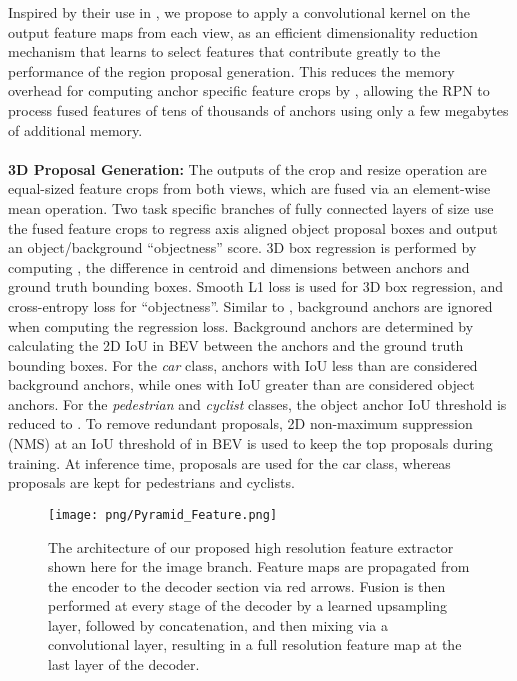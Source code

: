 \documentclass[letterpaper, 10 pt, conference]{ieeeconf}
\begin{document}
Inspired by their use in \cite{iandola2016squeezenet}, we propose to apply a  convolutional kernel on the output feature maps from each view, as an efficient dimensionality reduction mechanism that learns to select features that contribute greatly to the performance of the region proposal generation. This reduces the memory overhead for computing anchor specific feature crops by , allowing the RPN to process fused features of tens of thousands of anchors using only a few megabytes of additional memory.
\\
\\
\textbf{3D Proposal Generation:} The outputs of the crop and resize operation are equal-sized feature crops from both views, which are fused via an element-wise mean operation. Two task specific branches \cite{ren2015faster} of fully connected layers of size  use the fused feature crops to regress axis aligned object proposal boxes and output an object/background ``objectness'' score. 3D box regression is performed by computing , the difference in centroid and dimensions between anchors and ground truth bounding boxes. Smooth L1 loss is used for 3D box regression, and cross-entropy loss for ``objectness''. Similar to \cite{ren2015faster}, background anchors are ignored when computing the regression loss. Background anchors are determined by calculating the 2D IoU in BEV between the anchors and the ground truth bounding boxes. For the \textit{car} class, anchors with IoU less than  are considered background anchors, while ones with IoU greater than  are considered object anchors. For the \textit{pedestrian} and \textit{cyclist} classes, the object anchor IoU threshold is reduced to . To remove redundant proposals, 2D non-maximum suppression (NMS) at an IoU threshold of  in BEV is used to keep the top  proposals during training. At inference time,  proposals are used for the car class, whereas  proposals are kept for pedestrians and cyclists.

\begin{figure}[t] 
\centering
\texttt{[image: png/Pyramid\_Feature.png]}
\caption{The architecture of our proposed high resolution feature extractor shown here for the image branch. Feature maps are propagated from the encoder to the decoder section via red arrows. Fusion is then performed at every stage of the decoder by a learned upsampling layer, followed by concatenation, and then mixing via a convolutional layer, resulting in a full resolution feature map at the last layer of the decoder.}
\label{pyr}
\end{figure}
\end{document}
